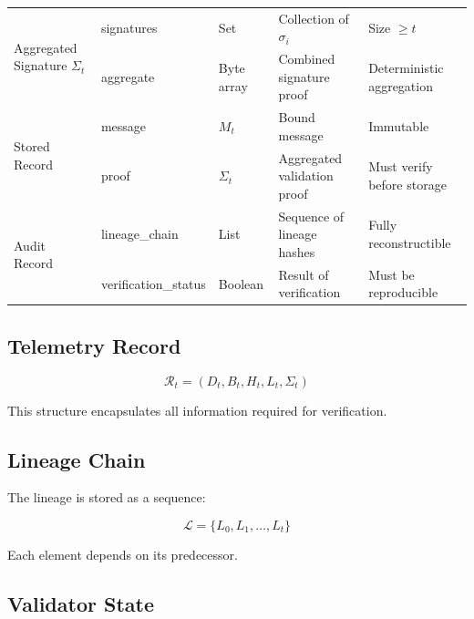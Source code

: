 \begin{table}[htbp]
\begin{tabularx}{\textwidth}{|p{3cm}|p{3cm}|X|X|X|}
\hline

\multirow{2}{*}{Aggregated Signature $\Sigma_t$}
 & signatures & Set & Collection of $\sigma_i$ & Size $\geq t$ \\
 & aggregate & Byte array & Combined signature proof & Deterministic aggregation \\

\hline

\multirow{2}{*}{Stored Record}
 & message & $M_t$ & Bound message & Immutable \\
 & proof & $\Sigma_t$ & Aggregated validation proof & Must verify before storage \\

\hline

\multirow{2}{*}{Audit Record}
 & lineage\_chain & List & Sequence of lineage hashes & Fully reconstructible \\
 & verification\_status & Boolean & Result of verification & Must be reproducible \\

\hline

\end{tabularx}
\end{table}

\subsection{Telemetry Record}

\begin{equation}
\mathcal{R}_t = (D_t, B_t, H_t, L_t, \Sigma_t)
\end{equation}

This structure encapsulates all information required for verification.

\subsection{Lineage Chain}

The lineage is stored as a sequence:

\begin{equation}
\mathcal{L} = \{L_0, L_1, \dots, L_t\}
\end{equation}

Each element depends on its predecessor.

\subsection{Validator State}

